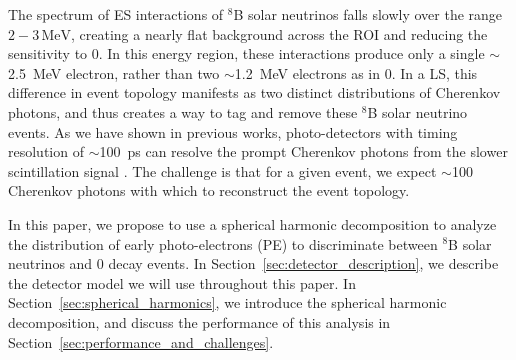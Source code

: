 The spectrum of ES interactions of $^{8}$B solar neutrinos falls
slowly over the range $2-3\,\mathrm{MeV}$, creating a nearly flat
background across the ROI and reducing the sensitivity to 0{\nbb}. In
this energy region, these interactions produce only a single
$\sim$2.5~MeV electron, rather than two $\sim$1.2~MeV electrons as in
0{\nbb}. In a LS, this difference in event topology manifests as two
distinct distributions of Cherenkov photons, and thus creates a way to
tag and remove these $^{8}$B solar neutrino events. As we have shown
in previous works, photo-detectors with timing resolution of
$\sim$100~ps can resolve the prompt Cherenkov photons from the slower
scintillation signal \cite{Aberle2014}. The challenge is that for a
given event, we expect $\sim$100 Cherenkov photons with which to
reconstruct the event topology. 

In this paper, we propose to use a spherical harmonic decomposition
to analyze the distribution of early photo-electrons (PE) to
discriminate between $^{8}$B solar neutrinos and 0{\nbb} decay
events. In Section~\ref{sec:detector_description}, we describe the
detector model we will use throughout this paper. In
Section~\ref{sec:spherical_harmonics}, we introduce the spherical
harmonic decomposition, and discuss the performance of this analysis
in Section~\ref{sec:performance_and_challenges}.




